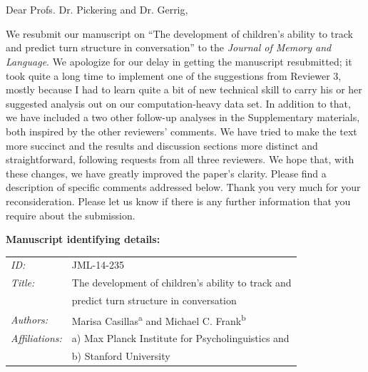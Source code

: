 \documentclass[11pt,a4paper]{letter} %
\def\opening#1{\thispagestyle{empty}
{\centering\fromaddress \vspace{0.6in} \\ %
\hspace*{\longindentation}\hspace*{\fill}\par} %
{\raggedright \toname \\ \toaddress \par} %
\vspace{0.4in} %
\noindent #1 %
}
\begin{document}

\begin{letter}{}


\opening{Dear Profs. Dr. Pickering and Dr. Gerrig,}

\smallskip

We resubmit our manuscript on ``The development of children's ability to track and predict turn structure in conversation'' to the \textit{Journal of Memory and Language}. We apologize for our delay in getting the manuscript resubmitted; it took quite a long time to implement one of the suggestions from Reviewer 3, mostly because I had to learn quite a bit of new technical skill to carry his or her suggested analysis out on our computation-heavy data set. In addition to that, we have included a two other follow-up analyses in the Supplementary materials, both inspired by the other reviewers' comments. We have tried to make the text more succinct and the results and discussion sections more distinct and straightforward, following requests from all three reviewers. We hope that, with these changes, we have greatly improved the paper's clarity. Please find a description of specific comments addressed below. Thank you very much for your reconsideration. Please let us know if there is any further information that you require about the submission.

\textbf{Manuscript identifying details:}

\begin{tabular}{ll}
\textit{ID:} & JML-14-235 \\
\textit{Title:} & The development of children's ability to track and \\
& predict turn structure in conversation \\
\textit{Authors:} & Marisa Casillas\textsuperscript{a} and Michael C. Frank\textsuperscript{b} \\
\textit{Affiliations:} & a) Max Planck Institute for Psycholinguistics and \\
& b) Stanford University
\end{tabular}


\end{letter}
\end{document}
